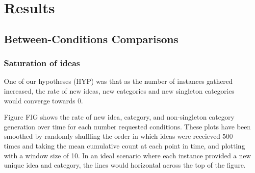 \section{Results}

\subsection{Between-Conditions Comparisons}

\subsubsection{Saturation of ideas}

One of our hypotheses (HYP) was that as the number of instances gathered increased, the rate of new ideas, new categories and new singleton categories would converge towards 0.

Figure FIG shows the rate of new idea, category, and non-singleton category generation  over time for each number requested conditions. These plots have been smoothed by randomly shuffling the order in which ideas were receieved 500 times and taking the mean cumulative count at each point in time, and plotting with a window size of 10. In an ideal scenario where each instance provided a new unique idea and category, the lines would horizontal across the top of the figure.

